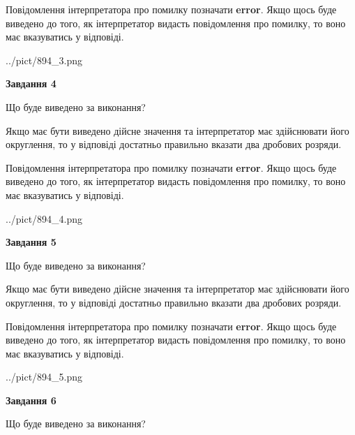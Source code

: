 \documentclass[12pt, ukrainian]{article}
\begin{document}
{\begin {Large}
Повідомлення інтерпретатора про помилку позначати \textbf{error}.
Якщо щось буде виведено до того, як інтерпретатор видасть повідомлення про помилку, 
то воно має вказуватись у відповіді. \par

\begin{center}
	{../pict/894_3.png}
\end{center}
\newpage

{\begin {center}\textbf{Завдання 4}\end {center}}\par
Що буде виведено за виконання? \par

Якщо має бути виведено дійсне значення та інтерпретатор має здійснювати його округлення, 
то у відповіді достатньо правильно вказати два дробових розряди.

Повідомлення інтерпретатора про помилку позначати \textbf{error}.
Якщо щось буде виведено до того, як інтерпретатор видасть повідомлення про помилку, 
то воно має вказуватись у відповіді. \par

\begin{center}
	{../pict/894_4.png}
\end{center}
\newpage

{\begin {center}\textbf{Завдання 5}\end {center}}\par
Що буде виведено за виконання? \par

Якщо має бути виведено дійсне значення та інтерпретатор має здійснювати його округлення, 
то у відповіді достатньо правильно вказати два дробових розряди.

Повідомлення інтерпретатора про помилку позначати \textbf{error}.
Якщо щось буде виведено до того, як інтерпретатор видасть повідомлення про помилку, 
то воно має вказуватись у відповіді. \par

\begin{center}
	{../pict/894_5.png}
\end{center}
\newpage

{\begin {center}\textbf{Завдання 6}\end {center}}\par
Що буде виведено за виконання? \par


\end{Large}}
\end{document}
